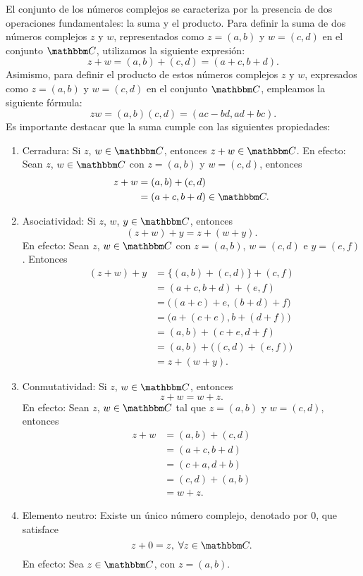 El conjunto de los números complejos se caracteriza por la presencia de dos operaciones fundamentales: la suma y el producto. Para definir la suma de dos números complejos $z$ y $w$, representados como $z=(a,  b)$ y $w=(c,  d)$ en el conjunto $\CC$, utilizamos la siguiente expresión:
$$z + w=(a,  b)+(c,  d)=(a+c,  b+d).$$
Asimismo, para definir el producto de estos números complejos $z$ y $w$, expresados como $z=(a,  b)$ y $w=(c,  d)$ en el conjunto $\CC$, empleamos la siguiente fórmula:
$$zw=(a,  b)(c,  d)=(ac-bd,  ad+bc).$$
Es importante destacar que la suma cumple con las siguientes propiedades:\newpage
\begin{enumerate}[label=A\arabic*.]
    \item Cerradura: Si $z$, $w \in \CC$, entonces $z+w \in \CC$. En efecto: Sean $z$, $w \in \CC$ con $z=(a,  b)$ y $w=(c,  d)$, entonces
    \begin{align*}
        z+w & = (a,  b)+(c,  d) \\
        & = (a+c,  b+d) \in \CC.
    \end{align*}
    \item Asociatividad: Si $z$, $w$, $y \in \CC$, entonces
    $$(z+w)+y=z+(w+y).$$
    En efecto: Sean $z$, $w \in \CC$ con $z=(a,  b)$, $w=(c,  d)$ e $y=(e,  f)$. Entonces
    \begin{align*}
        (z+w)+y &=\{(a,  b)+(c,  d) \} +(c,  f) \\
        &=(a+c,  b+d)+(e,  f) \\
        &=\big( (a+c)+e,  (b+d)+f \big) \\
        &=\big( a+(c+e),  b+(d+f) \big) \\
        &=(a,  b)+(c+e,  d+f) \\
        &=(a,  b)+ \big( (c,  d)+(e,  f) \big) \\
        &=z+(w+y).
    \end{align*}
    \item Conmutatividad: Si $z$, $w \in \CC$, entonces
    $$z+w=w+z.$$
    En efecto: Sean $z$, $w \in \CC$ tal que $z=(a,  b)$ y $w=(c,  d)$, entonces
    \begin{align*}
        z+w &=(a,  b)+(c,  d) \\
        &=(a+c,  b+d) \\
        &=(c+a,  d+b) \\
        &=(c,  d)+(a,  b) \\
        &=w+z.
    \end{align*}
    \item Elemento neutro: Existe un único número complejo, denotado por $0$, que satisface
    $$z+0=z, \; \forall z \in \CC.$$
    En efecto: Sea $z \in \CC$, con $z=(a,  b)$.
    

\end{enumerate}
